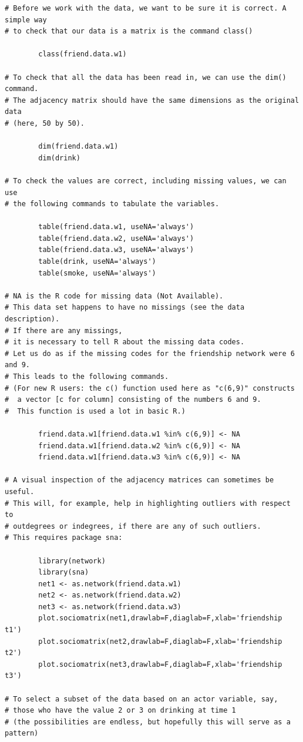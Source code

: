 \documentclass[a4paper,fleqn]{article}
\newcommand{\+}{\, + \,}
\begin{document}
{\begin{verbatim}
# Before we work with the data, we want to be sure it is correct. A simple way
# to check that our data is a matrix is the command class()

        class(friend.data.w1)

# To check that all the data has been read in, we can use the dim() command.
# The adjacency matrix should have the same dimensions as the original data
# (here, 50 by 50).

        dim(friend.data.w1)
        dim(drink)

# To check the values are correct, including missing values, we can use
# the following commands to tabulate the variables.

        table(friend.data.w1, useNA='always')
        table(friend.data.w2, useNA='always')
        table(friend.data.w3, useNA='always')
        table(drink, useNA='always')
        table(smoke, useNA='always')

# NA is the R code for missing data (Not Available).
# This data set happens to have no missings (see the data description).
# If there are any missings,
# it is necessary to tell R about the missing data codes.
# Let us do as if the missing codes for the friendship network were 6 and 9.
# This leads to the following commands.
# (For new R users: the c() function used here as "c(6,9)" constructs
#  a vector [c for column] consisting of the numbers 6 and 9.
#  This function is used a lot in basic R.)

        friend.data.w1[friend.data.w1 %in% c(6,9)] <- NA
        friend.data.w1[friend.data.w2 %in% c(6,9)] <- NA
        friend.data.w1[friend.data.w3 %in% c(6,9)] <- NA

# A visual inspection of the adjacency matrices can sometimes be useful.
# This will, for example, help in highlighting outliers with respect to
# outdegrees or indegrees, if there are any of such outliers.
# This requires package sna:

        library(network)
        library(sna)
        net1 <- as.network(friend.data.w1)
        net2 <- as.network(friend.data.w2)
        net3 <- as.network(friend.data.w3)
        plot.sociomatrix(net1,drawlab=F,diaglab=F,xlab='friendship t1')
        plot.sociomatrix(net2,drawlab=F,diaglab=F,xlab='friendship t2')
        plot.sociomatrix(net3,drawlab=F,diaglab=F,xlab='friendship t3')

# To select a subset of the data based on an actor variable, say,
# those who have the value 2 or 3 on drinking at time 1
# (the possibilities are endless, but hopefully this will serve as a pattern)


\end{verbatim}}
\end{document}
